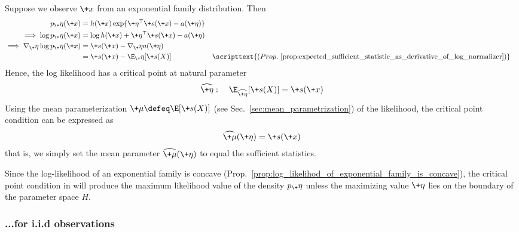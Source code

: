 \documentclass{article} %
\newcommand{\obs}{\+x}
\newcommand{\obsCaps}{X}
\newcommand{\logNormalizerFunction}{a}
\newcommand{\sufficientStatsFunction}{\+s}
\newcommand{\carrierDensity}{h}
\newcommand{\meanParam}{\+\mu}
\newcommand{\naturalParam}{\+\eta}
\newcommand{\naturalParamSpace}{H}
\begin{document}
Suppose we observe $\obs$ from an exponential family distribution. Then 
%
\begin{align*}
 p_\naturalParam(\obs) &= \carrierDensity(\obs) \exp \{ \naturalParam^\top \sufficientStatsFunction(\obs) - \logNormalizerFunction(\naturalParam)\}  \\
\implies \log  p_\naturalParam(\obs) &= \log \carrierDensity(\obs) +  \naturalParam^\top \sufficientStatsFunction(\obs) - \logNormalizerFunction(\naturalParam) \\
 \implies \nabla_\naturalParam \log  p_\naturalParam(\obs) &= \sufficientStatsFunction(\obs) - \nabla_\naturalParam \logNormalizerFunction(\naturalParam) 
 \\ &= \sufficientStatsFunction(\obs) - \E_\naturalParam[\sufficientStatsFunction(\obsCaps)] && \scripttext{(Prop.~ \ref{prop:expected_sufficient_statistic_as_derivative_of_log_normalizer})}
 \end{align*}
%
Hence, the log likelihood has a critical point at natural parameter 
%
\begin{align}
\widehat{\naturalParam} : \quad   \E_{\widehat{\naturalParam}}[\sufficientStatsFunction(\obsCaps)] = \sufficientStatsFunction(\obs)
\label{eqn:condition_for_critical_point_of_EF_likelihood}
\end{align}
% 
Using the mean parameterization $\meanParam \defeq \E[\sufficientStatsFunction(X)]$ (see Sec.~\ref{sec:mean_parametrization}) of the likelihood,  the critical point condition can be expressed as 
%
\begin{align}\widehat{\meanParam}(\naturalParam) = \sufficientStatsFunction(\obs)
\label{eqn:condition_for_critical_point_of_EF_likelihood__under_mean_parametrization}
\end{align}
% 
that is, we simply set the mean parameter $\widehat{\meanParam}(\naturalParam)$ to equal the sufficient statistics.

Since the log-likelihood of an exponential family is concave (Prop.~\ref{prop:log_likelihod_of_exponential_family_is_concave}), the critical point condition in  will produce the maximum likelihood value of the density $p_\naturalParam$ unless the maximizing value $\naturalParam$ lies on the boundary of the parameter space $\naturalParamSpace$.


\subsubsection{...for i.i.d observations}
\end{document}
